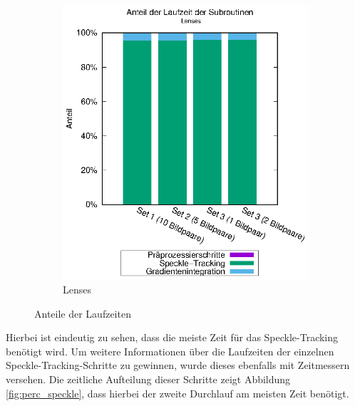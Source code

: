 \begin{center}
\begin{figure}[h!]
\begin{subfigure}[b]{0.5\textwidth}
			\includegraphics[width=\textwidth]{pdf/main_lenses}
			\caption{Lenses}
			\label{fig:perc_main_lenses}
		\end{subfigure}
		\caption{Anteile der Laufzeiten}
		\label{fig:perc_main}
	\end{figure}
\end{center}

Hierbei ist eindeutig zu sehen, dass die meiste Zeit für das Speckle-Tracking benötigt wird. Um weitere Informationen über die Laufzeiten der einzelnen Speckle-Tracking-Schritte zu gewinnen, wurde dieses ebenfalls mit Zeitmessern versehen. Die zeitliche Aufteilung dieser Schritte zeigt Abbildung \ref{fig:perc_speckle}, dass hierbei der zweite Durchlauf am meisten Zeit benötigt. 

